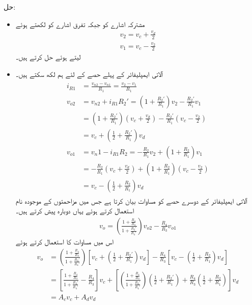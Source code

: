 حل:
\begin{itemize}
\item
مشترکہ اشارے کو  جبکہ تفرق اشارے کو  لکھتے ہوئے
\begin{align*}
v_2=v_c+\frac{v_d}{2}\\
v_1=v_c-\frac{v_2}{2}
\end{align*}
لیتے ہوئے حل کرتے ہیں۔ 
\item
آلاتی ایمپلیفائر کے پہلے حصے کے لئے ہم لکھ سکتے ہیں۔
\begin{gather}
\begin{aligned}\label{مساوات_آلاتی_پہلا_حصہ}
i_{R1}&=\frac{v_{n2}-v_{n1}}{R_1}=\frac{v_2-v_1}{R_1}\\
v_{o2}&=v_{n2}+i_{R1} R_2'=\left(1+\frac{R_2'}{R_1} \right) v_2-\frac{R_2'}{R_1} v_1\\
&=\left(1+\frac{R_2'}{R_1} \right) \left(v_c+\frac{v_d}{2} \right)-\frac{R_2'}{R_1} \left(v_c-\frac{v_2}{2} \right)\\
&=v_c+\left(\frac{1}{2}+\frac{R_2'}{R_1}\right) v_d\\
v_{o1}&=v_n1-i_{R1} R_2=-\frac{R_2}{R_1} v_2+\left(1+\frac{R_2}{R_1} \right) v_1\\
&=-\frac{R_2}{R_1} \left(v_c+\frac{v_d}{2} \right)+\left(1+\frac{R_2}{R_1} \right) \left(v_c-\frac{v_2}{2}\right)\\
&=v_c-\left(\frac{1}{2}+\frac{R_2}{R_1} \right) v_d
\end{aligned}
\end{gather}
آلاتی ایمپلیفائر کے دوسرے حصے کو مساوات  بیان کرتا ہے جس  میں مزاحمتوں کے موجودہ نام استعمال کرتے ہوئے یہاں دوبارہ پیش کرتے ہیں۔
\begin{align*}
v_o=\left(\frac{1+\frac{R_4}{R_3}}{1+\frac{R_3'}{R_4'}} \right) v_{o2}-\frac{R_4}{R_3}v_{o1}
\end{align*}
اس میں مساوات  کا استعمال کرتے ہوئے
\begin{align*}
v_o&=\left(\frac{1+\frac{R_4}{R_3}}{1+\frac{R_3'}{R_4'}} \right) \left[v_c+\left(\frac{1}{2}+\frac{R_2'}{R_1}\right) v_d \right]-\frac{R_4}{R_3}\left[ v_c-\left(\frac{1}{2}+\frac{R_2}{R_1} \right) v_d\right]\\
&=\left[\frac{1+\frac{R_4}{R_3}}{1+\frac{R_3'}{R_4'}} -\frac{R_4}{R_3} \right] v_c +\left[\left(\frac{1+\frac{R_4}{R_3}}{1+\frac{R_3'}{R_4'}} \right)\left(\frac{1}{2}+\frac{R_2'}{R_1} \right) +\frac{R_4 }{R_3 }\left(\frac{1}{2}+\frac{R_2}{R_1} \right)\right]v_d\\
&=A_c v_c +A_d v_d
\end{align*}

\end{itemize}
